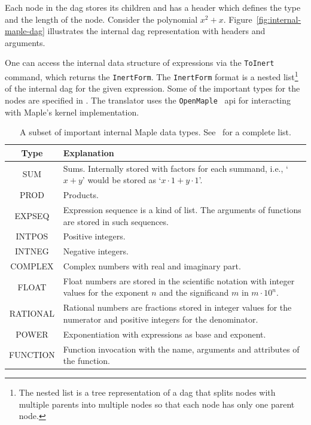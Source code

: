 \documentclass[a4paper,11pt]{article}
\newcommand{\Maple}{Maple}
\newcommand{\inertF}{\texttt{InertForm}}
\theoremstyle{defTheoStyle}
\theoremstyle{defExampStyle}
\begin{document}
	Each node in the \gls*{dag} stores its children and has a header which defines the type and the length of the node. Consider the polynomial $x^2+x$. Figure~\ref{fig:internal-maple-dag} illustrates the internal \gls*{dag} representation with headers and arguments.
	
	One can access the internal data structure of expressions via the \texttt{ToInert} command, which returns the \inertF. The \inertF{} format is a nested list\footnote{The nested list is a tree representation of a \gls*{dag} that splits nodes with multiple parents into multiple nodes so that each node has only one parent node.} of the internal \gls*{dag} for the given expression. Some of the important types for the nodes are specified in . The translator uses the \texttt{OpenMaple}~\parencite[\S 14.3]{MAPLE:ProgrammingGuide} \gls*{api} for interacting with \Maple's kernel implementation.
	
	\begin{table}[ht]
		\centering
		\begin{tabular}{cp{10cm}}
			\hline
			Type & Explanation\\
			\hline
			SUM & Sums. Internally stored with factors for each summand, i.e., `$x+y$' would be stored as `$x \cdot 1 + y \cdot 1$'.\\
			PROD & Products.\\
			EXPSEQ & Expression sequence is a kind of list. The arguments of functions are stored in such sequences.\\
			INTPOS & Positive integers.\\
			INTNEG & Negative integers.\\
			COMPLEX & Complex numbers with real and imaginary part.\\
			FLOAT & Float numbers are stored in the scientific notation with integer values for the exponent $n$ and the significand $m$ in $m \cdot 10^n$.\\
			RATIONAL & Rational numbers are fractions stored in integer values for the numerator and positive integers for the denominator.\\
			POWER & Exponentiation with expressions as base and exponent.\\
			FUNCTION & Function invocation with the name, arguments and attributes of the function.\\
			\hline
		\end{tabular}
		\caption{A subset of important internal \Maple{} data types. See~\parencite{MAPLE:ProgrammingGuide} for a complete list.}
		\label{tab:maple-types}
	\end{table}
	
\end{document}
